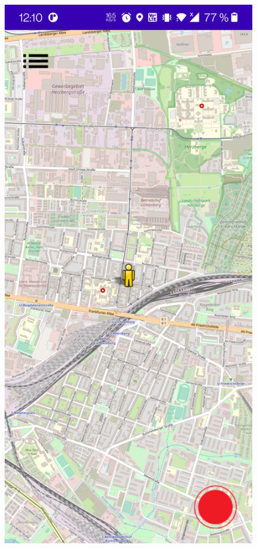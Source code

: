 \documentclass{article}
\begin{document}
	\begin{figure}[H]
		\captionsetup{justification=centering}
		  \includegraphics[width=\linewidth]{1_menu.jpg}

\end{figure}
\end{document}
